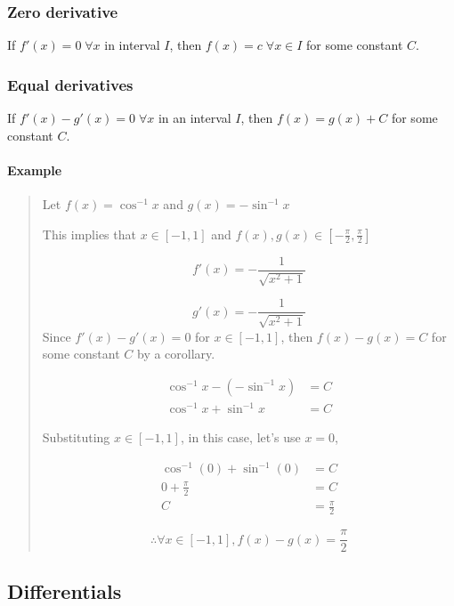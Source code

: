 \documentclass[
]{article}
\begin{document}
\hypertarget{zero-derivative}{%
\subsubsection{Zero derivative}\label{zero-derivative}}

If \(f'(x)=0 \;\forall x\) in interval \(I\), then
\(f(x)=c \;\forall x\in I\) for some constant \(C\).

\hypertarget{equal-derivatives}{%
\subsubsection{Equal derivatives}\label{equal-derivatives}}

If \(f'(x)-g'(x)=0 \;\forall x\) in an interval \(I\), then
\(f(x)=g(x)+C\) for some constant \(C\).

\hypertarget{example}{%
\paragraph{Example}\label{example}}

\begin{quote}
Let \(f(x)=\cos^{-1}x\) and \(g(x)=-\sin^{-1}x\)

This implies that \(x \in [-1,1]\) and
\(f(x),g(x) \in [-\frac{\pi}{2},\frac{\pi}{2}]\)

\[ f'(x)=-\frac{1}{\sqrt{x^2+1}}\]

\[ g'(x)=-\frac{1}{\sqrt{x^2+1}} \] Since \(f'(x)-g'(x)=0\) for
\(x \in [-1,1]\), then \(f(x)-g(x)=C\) for some constant \(C\) by a
corollary.

\begin{align*}
\cos^{-1}x - (-\sin^{-1}x)&=C \\
\cos^{-1}x +\sin^{-1}x&=C
\end{align*}

Substituting \(x \in [-1,1]\), in this case, let's use \(x=0\),

\begin{align*}
\cos^{-1}(0) +\sin^{-1}(0)&=C \\
0 + \frac{\pi}{2} &= C \\
C &= \frac{\pi}{2} 
\end{align*}

\[ \therefore \forall x \in[-1,1],f(x)-g(x)= \frac{\pi}{2}\]
\end{quote}

\hypertarget{differentials}{%
\subsection{Differentials}\label{differentials}}
\end{document}
